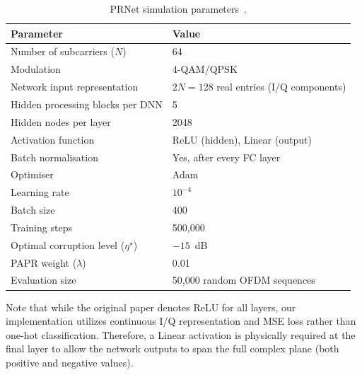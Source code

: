\begin{table}[H]
    \centering
    \caption{PRNet simulation parameters~\cite{kim2017novel}.}
    \label{tab:prnet_params}
    \begin{tabular}{@{} l l @{}}
        \toprule
        \textbf{Parameter}                      & \textbf{Value}                         \\
        \midrule
        Number of subcarriers ($N$)             & 64                                     \\
        Modulation                              & 4-QAM/QPSK                             \\
        Network input representation            & $2N=128$ real entries (I/Q components) \\
        Hidden processing blocks per DNN        & 5                                      \\
        Hidden nodes per layer                  & 2048                                   \\
        Activation function                     & ReLU (hidden), Linear (output)         \\
        Batch normalisation                     & Yes, after every FC layer              \\
        Optimiser                               & Adam                                   \\
        Learning rate                           & $10^{-4}$                              \\
        Batch size                              & 400                                    \\
        Training steps                          & 500{,}000                              \\
        Optimal corruption level ($\eta^\star$) & $-15$~dB                               \\
        PAPR weight ($\lambda$)                 & 0.01                                   \\
        Evaluation size                         & 50{,}000 random OFDM sequences         \\
        \bottomrule
    \end{tabular}
\end{table}

Note that while the original paper denotes ReLU for all layers, our implementation utilizes continuous I/Q representation and MSE loss rather than one-hot classification. Therefore, a Linear activation is physically required at the final layer to allow the network outputs to span the full complex plane (both positive and negative values).

